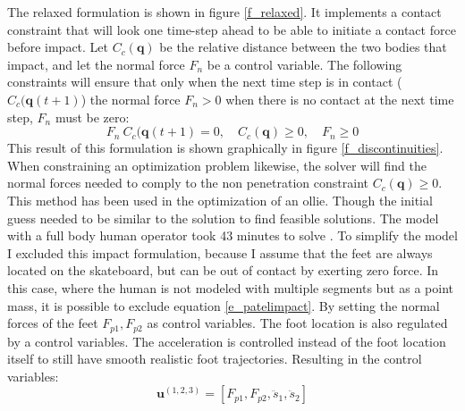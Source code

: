 \documentclass[default,iicol]{sn-jnl}
\theoremstyle{thmstyleone}%
\theoremstyle{thmstyletwo}%
\theoremstyle{thmstylethree}%
\begin{document}
The relaxed formulation is shown in figure \ref{f_relaxed}. It implements a contact constraint that will look one time-step ahead to be able to initiate a contact force before impact. Let $C_c(\mathbf{q})$ be the relative distance between the two bodies that impact, and let the normal force $F_n$ be a control variable. The following constraints will ensure that only when the next time step is in contact ($C_c(\mathbf{q}(t+1)$) the normal force $F_n > 0$ when there is no contact at the next time step, $F_n$ must be zero:
\begin{equation}\label{e_patelimpact}
    F_n\ C_c(\mathbf{q}(t+1) = 0,\quad C_c(\mathbf{q}) \geq 0,\quad F_n \geq 0
\end{equation}
This result of this formulation is shown graphically in figure \ref{f_discontinuities}. When constraining an optimization problem likewise, the solver will find the normal forces needed to comply to the non penetration constraint $C_c(\mathbf{q}) \geq 0$. This method has been used in the optimization of an ollie. Though the initial guess needed to be similar to the solution to find feasible solutions. The model with a full body human operator took 43 minutes to solve \cite{shield_contact-implicit_2022}. 
To simplify the model I excluded this impact formulation, because I assume that the feet are always located on the skateboard, but can be out of contact by exerting zero force. In this case, where the human is not modeled with multiple segments but as a point mass, it is possible to exclude equation \ref{e_patelimpact}. By setting the normal forces of the feet $F_{p1},F_{p2}$ as control variables. The foot location is also regulated by a control variables. The acceleration is controlled instead of the foot location itself to still have smooth realistic foot trajectories. Resulting in the control variables:
\begin{equation}
    \mathbf{u}^{(1,2,3)} = [F_{p1},F_{p2},\ddot s_1, \ddot s_2]    
\end{equation}
\end{document}
